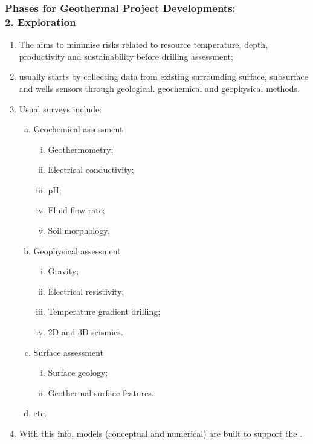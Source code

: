 \documentclass[10pt,compress,unknownkeysallowed]{beamer}
\begin{document}
\begin{frame}
 \frametitle{Phases for Geothermal Project Developments: \\ 2. Exploration} 

    \begin{enumerate}[{2.}1]\scriptsize
       \item <1-> The  aims to minimise risks related to resource temperature, depth, productivity and sustainability before drilling assessment;
       \item <2->  usually starts by collecting data from existing surrounding surface, subsurface and wells sensors through geological. geochemical and geophysical methods.
       \item <3-> Usual  surveys include:
          \begin{enumerate}[(a)]\scriptsize
             \item<4-> Geochemical assessment
                \begin{enumerate}[i)]\scriptsize
                   \item<4-> Geothermometry;
                   \item<4-> Electrical conductivity;
                   \item<4-> pH;
                   \item<4-> Fluid flow rate;
                   \item<4-> Soil morphology.
                \end{enumerate}
             \item<5-> Geophysical assessment
                \begin{enumerate}[i)]\scriptsize
                   \item<5-> Gravity;
                   \item<5-> Electrical resistivity;
                   \item<5-> Temperature gradient drilling;
                   \item<5-> 2D and 3D seismics.
                \end{enumerate}
             \item<6-> Surface assessment
                \begin{enumerate}[i)]\scriptsize
                   \item<6-> Surface geology;
                   \item<6-> Geothermal surface features.
                \end{enumerate}
             \item<7-> etc.
          \end{enumerate}
       \item <8-> With this info, models (conceptual and numerical) are built to support the . 
    \end{enumerate}
\end{frame}
 
\end{document}
